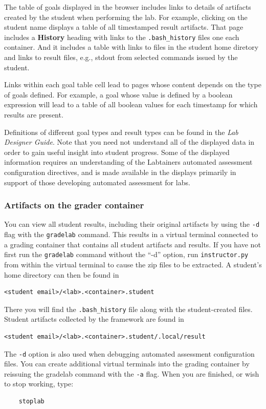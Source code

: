 \documentclass[12pt]{article}
\begin{document}
The table of goals displayed in the browser includes links to details of artifacts
created by the student when performing the lab.  For example, clicking on the student name displays a table
of all timestamped result artifacts.  That page includes a \textbf{History} heading with links to the
{\tt .bash\_history} files one each container.  And it includes a table with links to files in the student home diretory
and links to result files, e.g., stdout from selected commands issued by the student. 

Links within each goal table cell lead to pages whose content depends on the type of goals defined.  For example,
a goal whose value is defined by a boolean expression will lead to a table of all boolean values for each timestamp
for which results are present.

Definitions of different goal types and result types can be found in the \textit{Lab Designer Guide}.  Note that you need
not understand all of the displayed data in order to gain useful insight into student progress.  Some of the displayed information
requires an understanding of the Labtainers automated assessment configuration directives, and is made available in the displays 
primarily in support of those developing automated assessment for labs.

\subsubsection{Artifacts on the grader container}
You can view all student results, including their original artifacts by using the {\tt -d} flag
with the {\tt gradelab} command.  This results in a virtual terminal connected to a grading
container that contains all student artifacts and results.  If you have not first run the
{\tt gradelab} command without the ``-d'' option, run {\tt instructor.py} from within the
virtual terminal to cause the zip files to be extracted.  A student's home directory can
then be found in
\begin{verbatim}
<student email>/<lab>.<container>.student
\end{verbatim}
\noindent There you will find the {\tt .bash\_history} file along with the student-created files.
Student artifacts collected by the framework are found in 
\begin{verbatim}
<student email>/<lab>.<container>.student/.local/result
\end{verbatim}

\noindent The {\tt -d} option is also used when debugging automated assessment configuration
files.  You can create additional virtual terminals into the grading container by reissuing
the gradelab command with the {\tt -a} flag.  When you are finished, or wish to stop working, type:
\begin{verbatim}
    stoplab
\end{verbatim}
\end{document}
